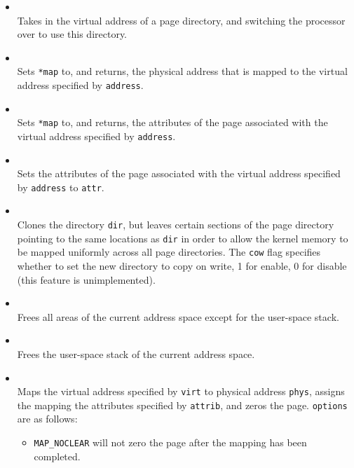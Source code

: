 \begin{itemize}

\item {} \\
Takes in the virtual address of a page directory, and switching the processor
over to use this directory.

\item {} \\
Sets \texttt{*map} to, and returns, the physical address that is mapped to the virtual address specified
by \texttt{address}.

\item {} \\
Sets \texttt{*map} to, and returns, the attributes of the page associated with the virtual address
specified by \texttt{address}.

\item {} \\
Sets the attributes of the page associated with the virtual address specified by \texttt{address}
to \texttt{attr}.

\item {} \\
Clones the directory \texttt{dir}, but leaves certain sections of the page directory pointing to the same
locations as \texttt{dir} in order to allow the kernel memory to be mapped uniformly across all page
directories. The \texttt{cow} flag specifies whether to set the new directory to copy on write, 1 for
enable, 0 for disable (this feature is unimplemented).

\item {} \\
Frees all areas of the current address space except for the user-space stack.

\item {} \\
Frees the user-space stack of the current address space.

\item {} \\
Maps the virtual address specified by \texttt{virt} to physical address \texttt{phys}, assigns the mapping the attributes
specified by \texttt{attrib}, and zeros the page. \texttt{options} are as follows:
\begin{itemize}
\item \texttt{MAP\_NOCLEAR} will not zero the page after the mapping has been completed.
\end{itemize}


\end{itemize}
